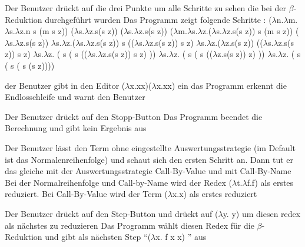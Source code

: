 \documentclass[parskip=full,11pt,twoside]{scrartcl}
\begin{document}
{
{ Der Benutzer drückt auf die drei Punkte um alle Schritte zu sehen die bei der $\beta$-Reduktion durchgeführt wurden }
{ Das Programm zeigt folgende Schritte :
\newline ($\lambda$n.$\lambda$m.$\lambda$s.$\lambda$z.n s (m s z)) ($\lambda$s.$\lambda$z.s(s z)) ($\lambda$s.$\lambda$z.s(s z))
\newline ($\lambda$m.$\lambda$s.$\lambda$z.($\lambda$s.$\lambda$z.s(s z)) s (m s z)) ($\lambda$s.$\lambda$z.s(s z))
\newline $\lambda$s.$\lambda$z.($\lambda$s.$\lambda$z.s(s z)) s (($\lambda$s.$\lambda$z.s(s z)) s z)
\newline $\lambda$s.$\lambda$z.($\lambda$z.s(s z)) (($\lambda$s.$\lambda$z.s(s z)) s z)
\newline $\lambda$s.$\lambda$z. ( s ( s (($\lambda$s.$\lambda$z.s(s z)) s z) ))
\newline $\lambda$s.$\lambda$z. ( s ( s (($\lambda$z.s(s z)) z) ))
\newline $\lambda$s.$\lambda$z. ( s ( s ( s (s z))))
 }

{der Benutzer gibt in den Editor ($\lambda$x.xx)($\lambda$x.xx) ein }
{ das Programm erkennt die Endlosschleife und warnt den Benutzer }
}





{Der Benutzer drückt auf den Stopp-Button}
{ Das Programm beendet die Berechnung und gibt kein Ergebnis aus }



{Der Benutzer lässt den Term ohne eingestellte Auswertungsstrategie (im Default ist das Normalenreihenfolge) und schaut sich den ersten Schritt an. Dann tut er das gleiche mit der Auswertungsstrategie Call-By-Value und  mit Call-By-Name}
{ Bei der Normalreihenfolge und Call-by-Name wird der Redex ($\lambda$t.$\lambda$f.f) als erstes reduziert. Bei Call-By-Value wird der Term ($\lambda$x.x) als erstes reduziert }

{Der Benutzer drückt auf den Step-Button und drückt auf ($\lambda$y. y) um diesen redex als nächstes zu reduzieren}
{Das Programm wählt diesen Redex für die $\beta$-Reduktion und gibt als nächsten Step \enquote{($\lambda$x. f x x) } aus  }
\end{document}
